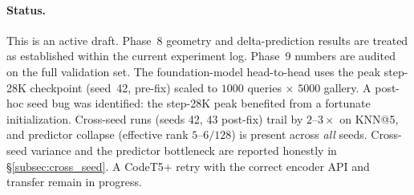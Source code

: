 \paragraph{Status.}
This is an active draft.  Phase~8 geometry and delta-prediction results
are treated as established within the current experiment log.  Phase~9
numbers are audited on the full validation set.  The foundation-model
head-to-head uses the peak step-28K checkpoint (seed~42, pre-fix) scaled
to $1000$ queries $\times$ $5000$ gallery.  A post-hoc seed bug was
identified: the step-28K peak benefited from a fortunate initialization.
Cross-seed runs (seeds 42, 43 post-fix) trail by $2\text{--}3\times$ on
KNN@5, and predictor collapse (effective rank $5\text{--}6/128$) is
present across \emph{all} seeds.  Cross-seed variance and the predictor
bottleneck are reported honestly in \S\ref{subsec:cross_seed}.  A
CodeT5+ retry with the correct encoder API and \KernelWM{} transfer
remain in progress.
